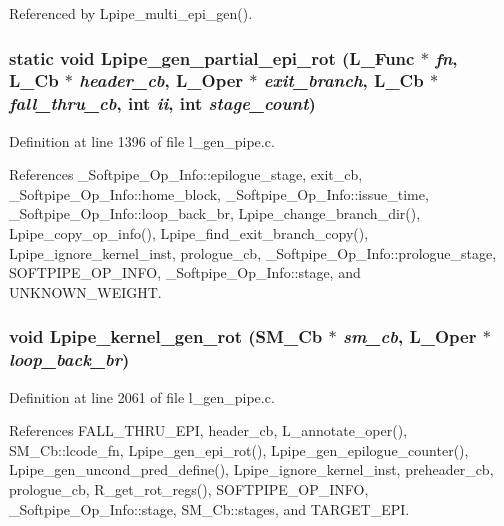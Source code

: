 Referenced by Lpipe\_\-multi\_\-epi\_\-gen().
\subsubsection{\setlength{\rightskip}{0pt plus 5cm}static void Lpipe\_\-gen\_\-partial\_\-epi\_\-rot (L\_\-Func $\ast$ {\em fn}, L\_\-Cb $\ast$ {\em header\_\-cb}, L\_\-Oper $\ast$ {\em exit\_\-branch}, L\_\-Cb $\ast$ {\em fall\_\-thru\_\-cb}, int {\em ii}, int {\em stage\_\-count})\hspace{0.3cm}{\tt  [static]}}\label{l__gen__pipe_8c_9377572e449c670f48d1f004429378d0}




Definition at line 1396 of file l\_\-gen\_\-pipe.c.

References \_\-Softpipe\_\-Op\_\-Info::epilogue\_\-stage, exit\_\-cb, \_\-Softpipe\_\-Op\_\-Info::home\_\-block, \_\-Softpipe\_\-Op\_\-Info::issue\_\-time, \_\-Softpipe\_\-Op\_\-Info::loop\_\-back\_\-br, Lpipe\_\-change\_\-branch\_\-dir(), Lpipe\_\-copy\_\-op\_\-info(), Lpipe\_\-find\_\-exit\_\-branch\_\-copy(), Lpipe\_\-ignore\_\-kernel\_\-inst, prologue\_\-cb, \_\-Softpipe\_\-Op\_\-Info::prologue\_\-stage, SOFTPIPE\_\-OP\_\-INFO, \_\-Softpipe\_\-Op\_\-Info::stage, and UNKNOWN\_\-WEIGHT.
\subsubsection{\setlength{\rightskip}{0pt plus 5cm}void Lpipe\_\-kernel\_\-gen\_\-rot (\bf{SM\_\-Cb} $\ast$ {\em sm\_\-cb}, L\_\-Oper $\ast$ {\em loop\_\-back\_\-br})}\label{l__gen__pipe_8c_719224974bbbb1c9845b638a30cedd93}




Definition at line 2061 of file l\_\-gen\_\-pipe.c.

References FALL\_\-THRU\_\-EPI, header\_\-cb, L\_\-annotate\_\-oper(), SM\_\-Cb::lcode\_\-fn, Lpipe\_\-gen\_\-epi\_\-rot(), Lpipe\_\-gen\_\-epilogue\_\-counter(), Lpipe\_\-gen\_\-uncond\_\-pred\_\-define(), Lpipe\_\-ignore\_\-kernel\_\-inst, preheader\_\-cb, prologue\_\-cb, R\_\-get\_\-rot\_\-regs(), SOFTPIPE\_\-OP\_\-INFO, \_\-Softpipe\_\-Op\_\-Info::stage, SM\_\-Cb::stages, and TARGET\_\-EPI.

